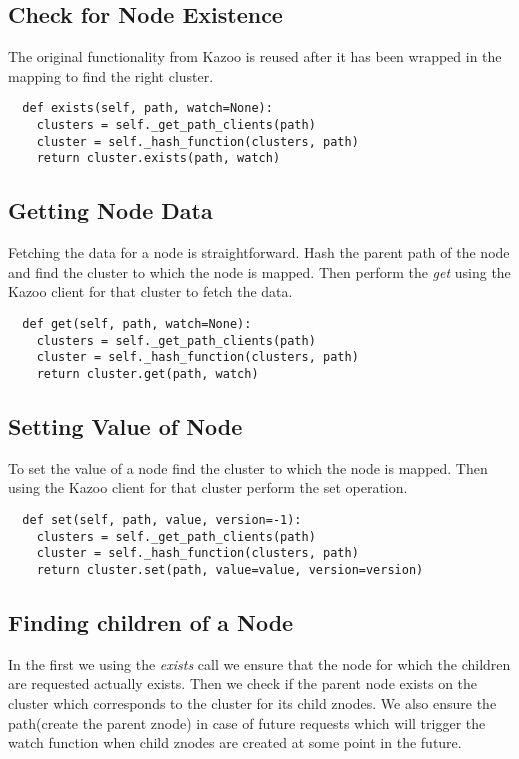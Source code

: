 \subsection{Check for Node Existence}
The original functionality from Kazoo is reused after it has been wrapped in the mapping to find the right cluster.

\begin{lstlisting}
  def exists(self, path, watch=None):
    clusters = self._get_path_clients(path)
    cluster = self._hash_function(clusters, path)
    return cluster.exists(path, watch)
\end{lstlisting}

\subsection{Getting Node Data}
Fetching the data for a node is straightforward. Hash the parent path of the node and find the cluster to which the node is mapped. Then perform the \textit{get} using the Kazoo client for that cluster to fetch the data.

\begin{lstlisting}
  def get(self, path, watch=None):
    clusters = self._get_path_clients(path)
    cluster = self._hash_function(clusters, path)
    return cluster.get(path, watch)
\end{lstlisting}


\subsection{Setting Value of Node}
To set the value of a node find the cluster to which the node is mapped. Then using the Kazoo client for that cluster perform the set operation. 

\begin{lstlisting}
  def set(self, path, value, version=-1):
    clusters = self._get_path_clients(path)
    cluster = self._hash_function(clusters, path)
    return cluster.set(path, value=value, version=version)
\end{lstlisting}

\subsection{Finding children of a Node}
In the first we using the \textit{exists} call we ensure that the node for which the children are requested actually exists. Then we check if the parent node exists on the cluster which corresponds to the cluster for its child znodes. We also ensure the path(create the parent znode) in case of future requests which will trigger the watch function when child znodes are created at some point in the future.

